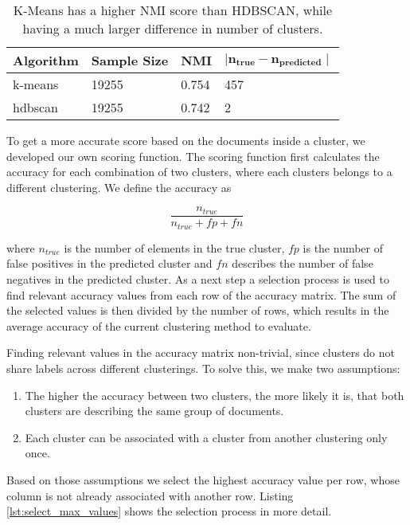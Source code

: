 
\begin{table}[h]
    \centering
    \begin{tabular}{|l|l|l|l|}
    \hline
    \textbf{Algorithm} & \textbf{Sample Size} & \textbf{NMI}  & $\mathbf{ \mid n_{true} - n_{predicted} \mid }$ \\ \hline
    k-means & 19255 & 0.754 & 457 \\ \hline
    hdbscan & 19255 & 0.742 & 2 \\ \hline
    \end{tabular}
    \caption{K-Means has a higher NMI score than HDBSCAN, while having a much larger difference in number of clusters.}
    \label{tab:nmi_kmeans_example}
\end{table}

To get a more accurate score based on the documents inside a cluster, we developed our own scoring function. The scoring function first calculates the accuracy for each combination of two clusters, where each clusters belongs to a different clustering. We define the accuracy as

\begin{equation}
    \label{equ:accuracy}
        \frac{n_{true}}{n_{true} + fp + fn}
    \end{equation}

where $n_{true}$ is the number of elements in the true cluster, $fp$ is the number of false positives in the predicted cluster and $fn$ describes the number of false negatives in the predicted cluster. As a next step a selection process is used to find relevant accuracy values from each row of the accuracy matrix. The sum of the selected values is then divided by the number of rows, which results in the average accuracy of the current clustering method to evaluate. 

Finding relevant values in the accuracy matrix non-trivial, since clusters do not share labels across different clusterings. To solve this, we make two assumptions:
\begin{enumerate} 
\item The higher the accuracy between two clusters, the more likely it is, that both clusters are describing the same group of documents. 
\item Each cluster can be associated with a cluster from another clustering only once.
\end{enumerate}

Based on those assumptions we select the highest accuracy value per row, whose column is not already associated with another row. Listing \ref{lst:select_max_values} shows the selection process in more detail. 


